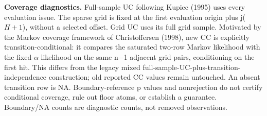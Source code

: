 \documentclass[11pt,a4paper]{article}
\begin{document}
\endgroup
\textbf{Coverage diagnostics.} Full-sample UC following Kupiec (1995) uses every evaluation issue. The sparse grid is fixed at the first evaluation origin plus j(\(H+1\)), without a selected offset. Grid UC uses its full grid sample. Motivated by the Markov coverage framework of Christoffersen (1998), new CC is explicitly transition-conditional: it compares the saturated two-row Markov likelihood with the fixed-\(\alpha\) likelihood on the same n\(-\)1 adjacent grid pairs, conditioning on the first hit. This differs from the legacy mixed full-sample-UC-plus-transition-independence construction; old reported CC values remain untouched. An absent transition row is NA. Boundary-reference p values and nonrejection do not certify conditional coverage, rule out floor atoms, or establish a guarantee. Boundary/NA counts are diagnostic counts, not removed observations.
\end{document}

